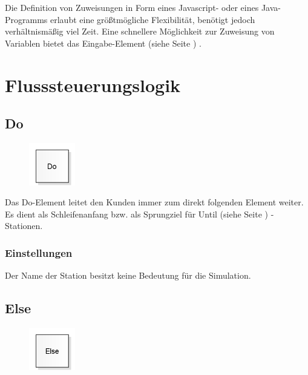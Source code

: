 Die Definition von Zuweisungen in Form eines Javascript- oder eines Java-Programms erlaubt eine größtmögliche Flexibilität,
benötigt jedoch verhältnismäßig viel Zeit. Eine schnellere Möglichkeit zur Zuweisung von Variablen
bietet das Eingabe-Element (siehe Seite \pageref{ref:ModelElementInput}) .





\chapter{Flusssteuerungslogik}

\section{Do}
\label{ref:ModelElementLogicDo}

\begin{figure}
\vspace{-22pt}
\includegraphics[width=2cm]{imageModelElementLogicDo.png}
\vspace{-22pt}
\end{figure}

Das Do-Element leitet den Kunden immer zum direkt folgenden Element weiter.
Es dient als Schleifenanfang bzw. als Sprungziel für
Until (siehe Seite \pageref{ref:ModelElementLogicUntil}) -Stationen.

\subsection*{Einstellungen}

Der Name der Station besitzt keine Bedeutung für die Simulation.


\section{Else}
\label{ref:ModelElementLogicElse}

\begin{figure}
\vspace{-22pt}
\includegraphics[width=2cm]{imageModelElementLogicElse.png}
\vspace{-22pt}
\end{figure}

